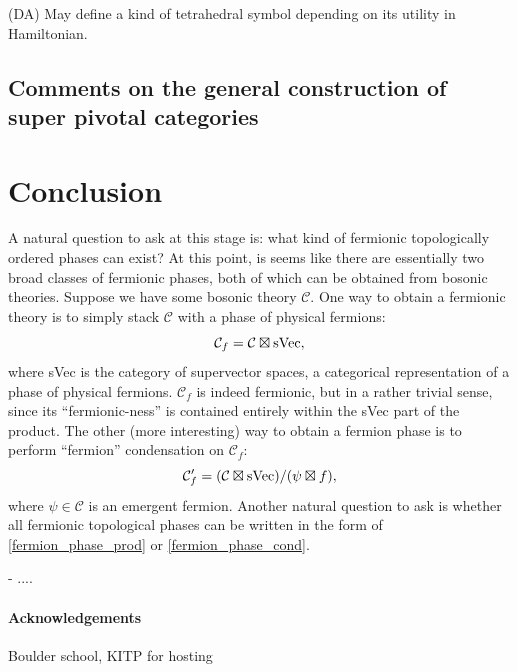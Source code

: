 \documentclass[12pt,a4paper]{article}
\newcommand\be            {\begin{equation}}
\newcommand\ee            {\end{equation}}
\newcommand{\mcc}{\mathcal{C}}
\newcommand{\dave}[1]{{\color{ao(english)}\footnotesize{(DA) #1}}}
\begin{document}
\dave{May define a kind of tetrahedral symbol depending on its utility in Hamiltonian.}


\subsection{Comments on the general construction of super pivotal categories}




\section{Conclusion}

A natural question to ask at this stage is: what kind of fermionic topologically ordered phases can exist? At this point, is seems like there are essentially two broad classes of fermionic phases, both of which can be obtained from bosonic theories. Suppose we have some bosonic theory $\mcc$. One way to obtain a fermionic theory is to simply stack $\mcc$ with a phase of physical fermions:
\be \label{fermion_phase_prod} \mcc_f = \mcc \boxtimes {\rm sVec}, \ee
where sVec is the category of supervector spaces, a categorical representation of a phase of physical fermions. $\mcc_f$ is indeed fermionic, but in a rather trivial sense, since its ``fermionic-ness'' is contained entirely within the sVec part of the product. The other (more interesting) way to obtain a fermion phase is to perform ``fermion'' condensation on $\mcc_f$:
\be \label{fermion_phase_cond} \mcc_f' = (\mcc \boxtimes {\rm sVec}) / (\psi \boxtimes f),\ee
where $\psi \in \mcc$ is an emergent fermion. 
Another natural question to ask is whether all fermionic topological phases can be written in the form of \eqref{fermion_phase_prod} or \eqref{fermion_phase_cond}. 

 - ....
 
 \paragraph{Acknowledgements}
 Boulder school, KITP for hosting
 
 

{}



\end{document}
